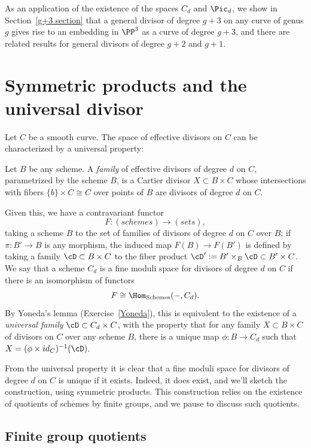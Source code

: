 As an application of the existence of the spaces $C_d$ and $\Pic_d$, we show in Section~\ref{g+3 section} that a general divisor of degree $g+3$ on any curve of genus $g$ gives rise to an embedding in $\PP^3$ as a curve of degree $g+3$, and there are related results for general divisors of degree $g+2$ and $g+1$. 

\section{Symmetric products and the universal divisor}\label{symmetric section}

Let $C$ be a smooth curve. The space of effective divisors on $C$ can be characterized by a universal property:

\begin{definition}
Let $B$ be any scheme. A \emph{family} of effective divisors of degree $d$ on $C$, parametrized by the scheme $B$, is a Cartier divisor $X\subset B\times C$ whose intersections with fibers $\{b\} \times C \cong C$ over points of $B$ are divisors of degree $d$ on $C$.
\end{definition}

Given this, we have a contravariant functor 
$$
F : (schemes) \to (sets),
$$
taking a scheme $B$ to the set of families of divisors of degree $d$ on $C$ over $B$; if $\pi : B' \to B$ is any morphism, the induced map $F(B) \to F(B')$ is defined by taking a family $\cD \subset B \times C$ to the fiber product $\cD' :=  B' \times_B \cD \subset B' \times C$. We say that a scheme $C_d$ is a fine moduli space for divisors of degree $d$ on $C$ if there is an isomorphism of functors
$$
F \cong \Hom_{\rm{Schemes}}( -, C_d).
$$
By Yoneda's lemma (Exercise~\ref{Yoneda}), this is equivalent to the existence of a \emph{universal family} $\cD \subset C_d \times C$, with the property that for any family $X \subset B \times C$ of divisors on $C$ over any scheme $B$, there is a unique map $\phi : B \to C_d$ such that $X = (\phi \times id_{C})^{-1}(\cD)$.

From the universal property it is clear that a fine moduli space for divisors of degree $d$ on $C$ is unique if it exists. Indeed, it does exist, and we'll sketch the construction, using symmetric products. This construction relies on the existence of quotients of schemes by finite groups, and we pause to discuss such quotients.

\subsection{Finite group quotients}


